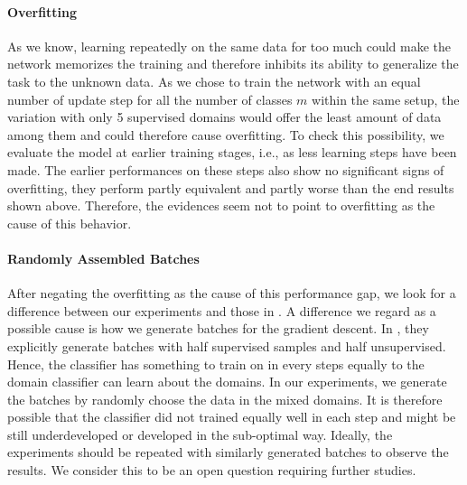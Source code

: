 \paragraph*{Overfitting} As we know, learning repeatedly on the same data for too much could make the network memorizes the training and therefore inhibits its ability to generalize the task to the unknown data. As we chose to train the network with an equal number of update step for all the number of classes $m$ within the same setup, the variation with only 5 supervised domains would offer the least amount of data among them and could therefore cause overfitting. To check this possibility, we evaluate the model at earlier training stages, i.e., as less learning steps have been made. The earlier performances on these steps also show no significant signs of overfitting, they perform partly equivalent and partly worse than the end results shown above. Therefore, the evidences seem not to point to overfitting as the cause of this behavior. 

\paragraph*{Randomly Assembled Batches} After negating the overfitting as the cause of this performance gap, we look for a difference between our experiments and those in \cite{domainMixture}. A difference we regard as a possible cause is how we generate batches for the gradient descent. In \cite{domainMixture}, they explicitly generate batches with half supervised samples and half unsupervised. Hence, the classifier has something to train on in every steps equally to the domain classifier can learn about the domains. In our experiments, we generate the batches by randomly choose the data in the mixed domains. It is therefore possible that the classifier did not trained equally well in each step and might be still underdeveloped or developed in the sub-optimal way. Ideally, the experiments should be repeated with similarly generated batches to observe the results. We consider this to be an open question requiring further studies. 


